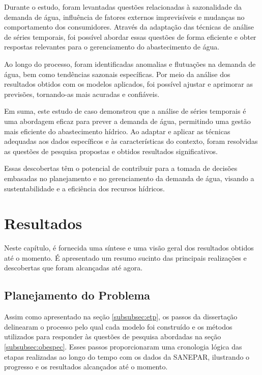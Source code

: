 Durante o estudo, foram levantadas questões relacionadas à sazonalidade da demanda de água, influência de fatores externos imprevisíveis e mudanças no comportamento dos consumidores. Através da adaptação das técnicas de análise de séries temporais, foi possível abordar essas questões de forma eficiente e obter respostas relevantes para o gerenciamento do abastecimento de água.

Ao longo do processo, foram identificadas anomalias e flutuações na demanda de água, bem como tendências sazonais específicas. Por meio da análise dos resultados obtidos com os modelos aplicados, foi possível ajustar e aprimorar as previsões, tornando-as mais acuradas e confiáveis.

Em suma, este estudo de caso demonstrou que a análise de séries temporais é uma abordagem eficaz para prever a demanda de água, permitindo uma gestão mais eficiente do abastecimento hídrico. Ao adaptar e aplicar as técnicas adequadas aos dados específicos e às características do contexto, foram resolvidas as questões de pesquisa propostas e obtidos resultados significativos.

Essas descobertas têm o potencial de contribuir para a tomada de decisões embasadas no planejamento e no gerenciamento da demanda de água, visando a sustentabilidade e a eficiência dos recursos hídricos.

\section{Resultados} \label{sec:result}

Neste capítulo, é fornecida uma síntese e uma visão geral dos resultados obtidos até o momento. É apresentado um resumo sucinto das principais realizações e descobertas que foram alcançadas até agora.


\subsection{Planejamento do Problema} \label{subsec:planexp}

Assim como apresentado na seção \ref{subsubsec:etp}, os passos da dissertação delinearam o processo pelo qual cada modelo foi construído e os métodos utilizados para responder às questões de pesquisa abordadas na seção \ref{subsubsec:obespec}. Esses passos proporcionaram uma cronologia lógica das etapas realizadas ao longo do tempo com os dados da SANEPAR, ilustrando o progresso e os resultados alcançados até o momento.


















  

 


